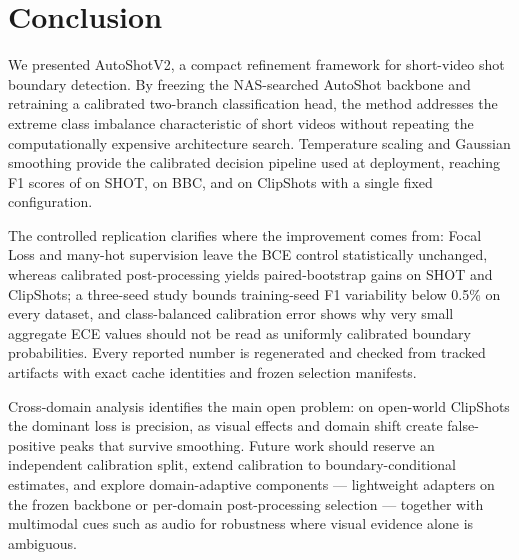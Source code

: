 \section{Conclusion}

We presented AutoShotV2, a compact refinement framework for short-video shot
boundary detection. By freezing the NAS-searched AutoShot backbone and
retraining a calibrated two-branch classification head, the method addresses
the extreme class imbalance characteristic of short videos without repeating
the computationally expensive architecture search. Temperature scaling and
Gaussian smoothing provide the calibrated decision pipeline used at
deployment, reaching F1 scores of \PaperDeployShotFOne{} on SHOT,
\PaperDeployBBCFOne{} on BBC, and \PaperDeployClipFOne{} on ClipShots with a
single fixed configuration.

The controlled replication clarifies where the improvement comes from:
Focal Loss and many-hot supervision leave the BCE control statistically
unchanged, whereas calibrated post-processing yields paired-bootstrap gains
on SHOT and ClipShots; a three-seed study bounds training-seed F1
variability below 0.5\% on every dataset, and class-balanced calibration
error shows why very small aggregate ECE values should not be read as
uniformly calibrated boundary probabilities. Every reported number is
regenerated and checked from tracked artifacts with exact cache identities
and frozen selection manifests.

Cross-domain analysis identifies the main open problem: on open-world
ClipShots the dominant loss is precision, as visual effects and domain shift
create false-positive peaks that survive smoothing. Future work should
reserve an independent calibration split, extend calibration to
boundary-conditional estimates, and explore domain-adaptive components ---
lightweight adapters on the frozen backbone or per-domain post-processing
selection --- together with multimodal cues such as audio for robustness
where visual evidence alone is ambiguous.
